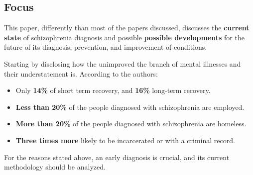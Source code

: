 \documentclass{Paper_Summary}
\begin{document}
\makepapertitle

\breakline

\begin{center}
    \section*{Focus}
\end{center}

    This paper, differently than most of the papers discussed, discusses the \textbf{current state} of schizophrenia diagnosis and possible \textbf{possible developments} for the future of its diagnosis, prevention, and improvement of conditions.

    Starting by disclosing how the unimproved the branch of mental illnesses and their understatement is. According to the authors:
    \begin{itemize}
        \item Only \textbf{14\%} of short term recovery, and \textbf{16\%} long-term recovery.
        \item \textbf{Less than 20\%} of the people diagnosed with schizophrenia are employed.
        \item \textbf{More than 20\%} of the people diagnosed with schizophrenia are homeless.
        \item \textbf{Three times more} likely to be incarcerated or with a criminal record.
    \end{itemize} 

    For the reasons stated above, an early diagnosis is crucial, and its current methodology should be analyzed.
\end{document}
